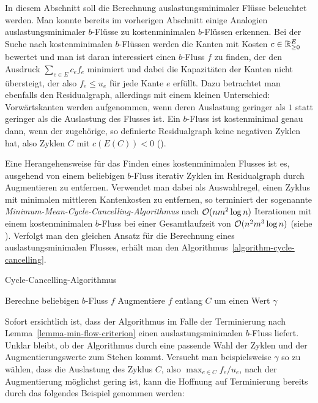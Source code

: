 In diesem Abschnitt soll die Berechnung auslastungsminimaler Flüsse beleuchtet werden.
Man konnte bereits im vorherigen Abschnitt einige Analogien auslastungsminimaler $b$-Flüsse zu kostenminimalen $b$-Flüssen erkennen.
Bei der Suche nach kostenminimalen $b$-Flüssen werden die Kanten mit Kosten $c\in\mathbb{R}_{\geq 0}^E$ bewertet und man ist daran interessiert einen $b$-Fluss $f$ zu finden, der den Ausdruck $\sum_{e \in E} c_e f_e$ minimiert und dabei die Kapazitäten der Kanten nicht übersteigt, der also $f_e \leq u_e$ für jede Kante $e$ erfüllt.
Dazu betrachtet man ebenfalls den Residualgraph, allerdings mit einem kleinen Unterschied: Vorwärtskanten werden aufgenommen, wenn deren Auslastung geringer als $1$ statt geringer als die Auslastung des Flusses ist.
Ein $b$-Fluss ist kostenminimal genau dann, wenn der zugehörige, so definierte Residualgraph keine negativen Zyklen hat, also Zyklen $C$ mit $c(E(C)) < 0$ ().

Eine Herangehensweise für das Finden eines kostenminimalen Flusses ist es, ausgehend von einem beliebigen $b$-Fluss iterativ Zyklen im Residualgraph durch Augmentieren zu entfernen.
Verwendet man dabei als Auswahlregel, einen Zyklus mit minimalen mittleren Kantenkosten zu entfernen, so terminiert der sogenannte \emph{Minimum-Mean-Cycle-Cancelling-Algorithmus} nach $\mathcal{O}(nm^2\log n)$ Iterationen mit einem kostenminimalen $b$-Fluss bei einer Gesamtlaufzeit von $\mathcal{O}(n^2m^3 \log n)$ (siehe \cite[Theoreme~3.9, 3.10]{Goldberg1989}).
Verfolgt man den gleichen Ansatz für die Berechnung eines auslastungsminimalen Flusses, erhält man den Algorithmus~\ref{algorithm-cycle-cancelling}.
\begin{algorithm}
	\caption{Cycle-Cancelling-Algorithmus}
	\label{algorithm-cycle-cancelling}
	\begin{algorithmic}[1]
		\State Berechne beliebigen $b$-Fluss $f$
			\State Augmentiere $f$ entlang $C$ um einen Wert $\gamma$
		\EndWhile
		\EndProcedure
	\end{algorithmic}
\end{algorithm}

Sofort ersichtlich ist, dass der Algorithmus im Falle der Terminierung nach Lemma~\ref{lemma-min-flow-criterion} einen auslastungsminimalen $b$-Fluss liefert.
Unklar bleibt, ob der Algorithmus durch eine passende Wahl der Zyklen und der Augmentierungswerte zum Stehen kommt.
Versucht man beispielsweise $\gamma$ so zu wählen, dass die Auslastung des Zyklus $C$, also $\max_{e\in C} f_e / u_e$, nach der Augmentierung möglichst gering ist, kann die Hoffnung auf Terminierung bereits durch das folgendes Beispiel genommen werden:

